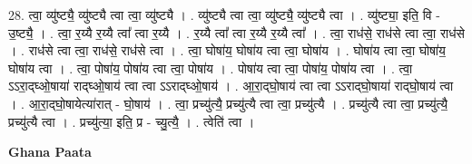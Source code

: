 \documentclass[17pt]{extarticle}
\begin{document}
28. त्वा॒ व्यु॑ष्ट्यै॒ व्यु॑ष्ट्यै त्वा त्वा॒ व्यु॑ष्ट्यै । . व्यु॑ष्ट्यै त्वा त्वा॒ व्यु॑ष्ट्यै॒ व्यु॑ष्ट्यै त्वा । . व्यु॑ष्ट्या॒ इति॒ वि - उ॒ष्ट्यै॒ । . त्वा॒ र॒य्यै र॒य्यै त्वा᳚ त्वा र॒य्यै । . र॒य्यै त्वा᳚ त्वा र॒य्यै र॒य्यै त्वा᳚ । . त्वा॒ राध॑से॒ राध॑से त्वा त्वा॒ राध॑से । . राध॑से त्वा त्वा॒ राध॑से॒ राध॑से त्वा । . त्वा॒ घोषा॑य॒ घोषा॑य त्वा त्वा॒ घोषा॑य । . घोषा॑य त्वा त्वा॒ घोषा॑य॒ घोषा॑य त्वा । . त्वा॒ पोषा॑य॒ पोषा॑य त्वा त्वा॒ पोषा॑य । . पोषा॑य त्वा त्वा॒ पोषा॑य॒ पोषा॑य त्वा । . त्वा॒ ऽऽरा॒द्घ्‍ओ॒षाया॑ राद्घ्‍ओ॒षाय॑ त्वा त्वा ऽऽराद्घ्‍ओ॒षाय॑ । . आ॒रा॒द्‍घो॒षाय॑ त्वा त्वा ऽऽराद्‍घो॒षाया॑ राद्‍घो॒षाय॑ त्वा । . आ॒रा॒द्‍घो॒षायेत्या॑रात् - घो॒षाय॑ । . त्वा॒ प्रच्यु॑त्यै॒ प्रच्यु॑त्यै त्वा त्वा॒ प्रच्यु॑त्यै । . प्रच्यु॑त्यै त्वा त्वा॒ प्रच्यु॑त्यै॒ प्रच्यु॑त्यै त्वा । . प्रच्यु॑त्या॒ इति॒ प्र - च्यु॒त्यै॒ । . त्वेति॑ त्वा । \newline

\textbf{Ghana Paata } \newline
\end{document}
